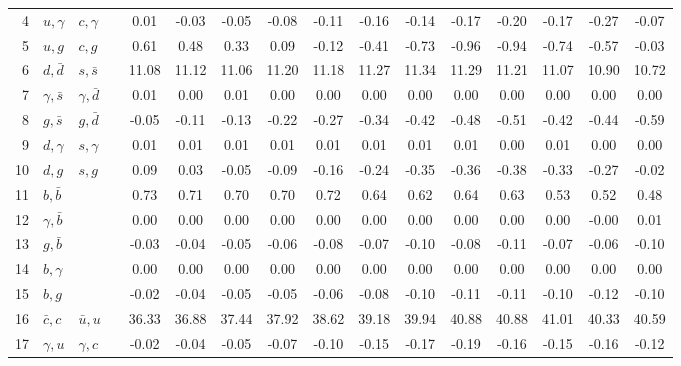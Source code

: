 \begin{tabularx}{\textwidth}{rXXX@{}S@{}S@{}S@{}S@{}S@{}S@{}S@{}S@{}S@{}S@{}S@{}S}
  4 & $u,\gamma$       & $c,\gamma$       &                 &  0.01 & -0.03 & -0.05 & -0.08 & -0.11 & -0.16 & -0.14 & -0.17 & -0.20 & -0.17 & -0.27 & -0.07 \\
  5 & $u,g$            & $c,g$            &                 &  0.61 &  0.48 &  0.33 &  0.09 & -0.12 & -0.41 & -0.73 & -0.96 & -0.94 & -0.74 & -0.57 & -0.03 \\
  6 & $d,\bar d$       & $s,\bar s$       &                 & 11.08 & 11.12 & 11.06 & 11.20 & 11.18 & 11.27 & 11.34 & 11.29 & 11.21 & 11.07 & 10.90 & 10.72 \\
  7 & $\gamma, \bar s$ & $\gamma, \bar d$ &                 &  0.01 &  0.00 &  0.01 &  0.00 &  0.00 &  0.00 &  0.00 &  0.00 &  0.00 &  0.00 &  0.00 &  0.00 \\
  8 & $g,\bar s$       & $g,\bar d$       &                 & -0.05 & -0.11 & -0.13 & -0.22 & -0.27 & -0.34 & -0.42 & -0.48 & -0.51 & -0.42 & -0.44 & -0.59 \\
  9 & $d,\gamma$       & $s,\gamma$       &                 &  0.01 &  0.01 &  0.01 &  0.01 &  0.01 &  0.01 &  0.01 &  0.01 &  0.00 &  0.01 &  0.00 &  0.00 \\
 10 & $d,g$            & $s,g$            &                 &  0.09 &  0.03 & -0.05 & -0.09 & -0.16 & -0.24 & -0.35 & -0.36 & -0.38 & -0.33 & -0.27 & -0.02 \\
 11 & $b,\bar b$       &                  &                 &  0.73 &  0.71 &  0.70 &  0.70 &  0.72 &  0.64 &  0.62 &  0.64 &  0.63 &  0.53 &  0.52 &  0.48 \\
 12 & $\gamma,\bar b$  &                  &                 &  0.00 &  0.00 &  0.00 &  0.00 &  0.00 &  0.00 &  0.00 &  0.00 &  0.00 &  0.00 & -0.00 &  0.01 \\
 13 & $g,\bar b$       &                  &                 & -0.03 & -0.04 & -0.05 & -0.06 & -0.08 & -0.07 & -0.10 & -0.08 & -0.11 & -0.07 & -0.06 & -0.10 \\
 14 & $b,\gamma$       &                  &                 &  0.00 &  0.00 &  0.00 &  0.00 &  0.00 &  0.00 &  0.00 &  0.00 &  0.00 &  0.00 &  0.00 &  0.00 \\
 15 & $b,g$            &                  &                 & -0.02 & -0.04 & -0.05 & -0.05 & -0.06 & -0.08 & -0.10 & -0.11 & -0.11 & -0.10 & -0.12 & -0.10 \\
 16 & $\bar c,c$       & $\bar u,u$       &                 & 36.33 & 36.88 & 37.44 & 37.92 & 38.62 & 39.18 & 39.94 & 40.88 & 40.88 & 41.01 & 40.33 & 40.59 \\
 17 & $\gamma, u$      & $\gamma, c$      &                 & -0.02 & -0.04 & -0.05 & -0.07 & -0.10 & -0.15 & -0.17 & -0.19 & -0.16 & -0.15 & -0.16 & -0.12 \\

\end{tabularx}

